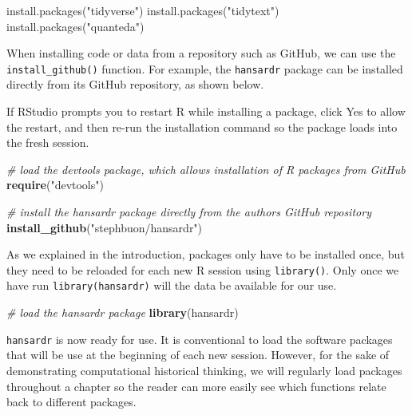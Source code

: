 \documentclass[
]{article}
\newenvironment{Shaded}{\begin{snugshade}}{\end{snugshade}}
\newcommand{\CommentTok}[1]{\textcolor[rgb]{0.56,0.35,0.01}{\textit{#1}}}
\newcommand{\FunctionTok}[1]{\textcolor[rgb]{0.13,0.29,0.53}{\textbf{#1}}}
\newcommand{\NormalTok}[1]{#1}
\newcommand{\StringTok}[1]{\textcolor[rgb]{0.31,0.60,0.02}{#1}}
\begin{document}
\begin{Shaded}
\begin{Highlighting}[]
\NormalTok{install.packages(}\StringTok{"tidyverse"}\NormalTok{)}
\NormalTok{install.packages(}\StringTok{"tidytext"}\NormalTok{)}
\NormalTok{install.packages(}\StringTok{"quanteda"}\NormalTok{)}
\end{Highlighting}
\end{Shaded}

When installing code or data from a repository such as GitHub, we can
use the \texttt{install\_github()} function. For example, the
\texttt{hansardr} package can be installed directly from its GitHub
repository, as shown below.

If RStudio prompts you to restart R while installing a package, click
Yes to allow the restart, and then re-run the installation command so
the package loads into the fresh session.

\begin{Shaded}
\begin{Highlighting}[]
\CommentTok{\# load the \textquotesingle{}devtools\textquotesingle{} package, which allows installation of R packages from GitHub}
\FunctionTok{require}\NormalTok{(}\StringTok{"devtools"}\NormalTok{)}

\CommentTok{\# install the \textquotesingle{}hansardr\textquotesingle{} package directly from the author\textquotesingle{}s GitHub repository}
\FunctionTok{install\_github}\NormalTok{(}\StringTok{"stephbuon/hansardr"}\NormalTok{)}
\end{Highlighting}
\end{Shaded}

As we explained in the introduction, packages only have to be installed
once, but they need to be reloaded for each new R session using
\texttt{library()}. Only once we have run \texttt{library(hansardr)}
will the data be available for our use.

\begin{Shaded}
\begin{Highlighting}[]
\CommentTok{\# load the hansardr package}
\FunctionTok{library}\NormalTok{(hansardr)}
\end{Highlighting}
\end{Shaded}

\texttt{hansardr} is now ready for use. It is conventional to load the
software packages that will be use at the beginning of each new session.
However, for the sake of demonstrating computational historical
thinking, we will regularly load packages throughout a chapter so the
reader can more easily see which functions relate back to different
packages.
\end{document}
